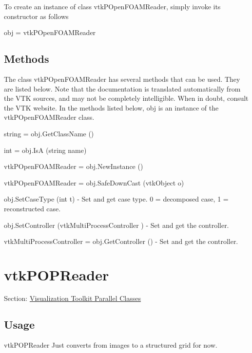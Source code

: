 To create an instance of class vtk\-P\-Open\-F\-O\-A\-M\-Reader, simply invoke its constructor as follows \begin{DoxyVerb}  obj = vtkPOpenFOAMReader
\end{DoxyVerb}
 \hypertarget{vtkwidgets_vtkxyplotwidget_Methods}{}\subsection{Methods}\label{vtkwidgets_vtkxyplotwidget_Methods}
The class vtk\-P\-Open\-F\-O\-A\-M\-Reader has several methods that can be used. They are listed below. Note that the documentation is translated automatically from the V\-T\-K sources, and may not be completely intelligible. When in doubt, consult the V\-T\-K website. In the methods listed below, {\ttfamily obj} is an instance of the vtk\-P\-Open\-F\-O\-A\-M\-Reader class. 
\begin{DoxyItemize}
\item {\ttfamily string = obj.\-Get\-Class\-Name ()}  
\item {\ttfamily int = obj.\-Is\-A (string name)}  
\item {\ttfamily vtk\-P\-Open\-F\-O\-A\-M\-Reader = obj.\-New\-Instance ()}  
\item {\ttfamily vtk\-P\-Open\-F\-O\-A\-M\-Reader = obj.\-Safe\-Down\-Cast (vtk\-Object o)}  
\item {\ttfamily obj.\-Set\-Case\-Type (int t)} -\/ Set and get case type. 0 = decomposed case, 1 = reconstructed case.  
\item {\ttfamily obj.\-Set\-Controller (vtk\-Multi\-Process\-Controller )} -\/ Set and get the controller.  
\item {\ttfamily vtk\-Multi\-Process\-Controller = obj.\-Get\-Controller ()} -\/ Set and get the controller.  
\end{DoxyItemize}\hypertarget{vtkparallel_vtkpopreader}{}\section{vtk\-P\-O\-P\-Reader}\label{vtkparallel_vtkpopreader}
Section\-: \hyperlink{sec_vtkparallel}{Visualization Toolkit Parallel Classes} \hypertarget{vtkwidgets_vtkxyplotwidget_Usage}{}\subsection{Usage}\label{vtkwidgets_vtkxyplotwidget_Usage}
vtk\-P\-O\-P\-Reader Just converts from images to a structured grid for now.

